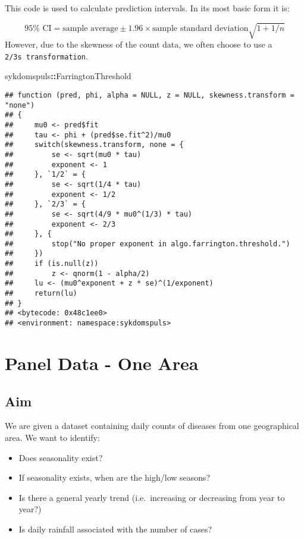 \documentclass[]{book}
\newenvironment{Shaded}{\begin{snugshade}}{\end{snugshade}}
\newcommand{\OperatorTok}[1]{\textcolor[rgb]{0.81,0.36,0.00}{\textbf{#1}}}
\newcommand{\NormalTok}[1]{#1}
\providecommand{\tightlist}{%
  \setlength{\itemsep}{0pt}\setlength{\parskip}{0pt}}
\begin{document}
This code is used to calculate prediction intervals. In its most basic
form it is:

\[
95\% \text{ CI} = \text{sample average} \pm 1.96 \times \text{sample standard deviation} \sqrt{ 1 + 1 / n}
\] However, due to the skewness of the count data, we often choose to
use a \texttt{2/3s\ transformation}.

\begin{Shaded}
\begin{Highlighting}[]
\NormalTok{sykdomspuls}\OperatorTok{::}\NormalTok{FarringtonThreshold}
\end{Highlighting}
\end{Shaded}

\begin{verbatim}
## function (pred, phi, alpha = NULL, z = NULL, skewness.transform = "none") 
## {
##     mu0 <- pred$fit
##     tau <- phi + (pred$se.fit^2)/mu0
##     switch(skewness.transform, none = {
##         se <- sqrt(mu0 * tau)
##         exponent <- 1
##     }, `1/2` = {
##         se <- sqrt(1/4 * tau)
##         exponent <- 1/2
##     }, `2/3` = {
##         se <- sqrt(4/9 * mu0^(1/3) * tau)
##         exponent <- 2/3
##     }, {
##         stop("No proper exponent in algo.farrington.threshold.")
##     })
##     if (is.null(z)) 
##         z <- qnorm(1 - alpha/2)
##     lu <- (mu0^exponent + z * se)^(1/exponent)
##     return(lu)
## }
## <bytecode: 0x48c1ee0>
## <environment: namespace:sykdomspuls>
\end{verbatim}

\chapter{Panel Data - One Area}\label{panel-data---one-area}

\section{Aim}\label{aim}

We are given a dataset containing daily counts of diseases from one
geographical area. We want to identify:

\begin{itemize}
\tightlist
\item
  Does seasonality exist?
\item
  If seasonality exists, when are the high/low seasons?
\item
  Is there a general yearly trend (i.e.~increasing or decreasing from
  year to year?)
\item
  Is daily rainfall associated with the number of cases?
\end{itemize}
\end{document}
